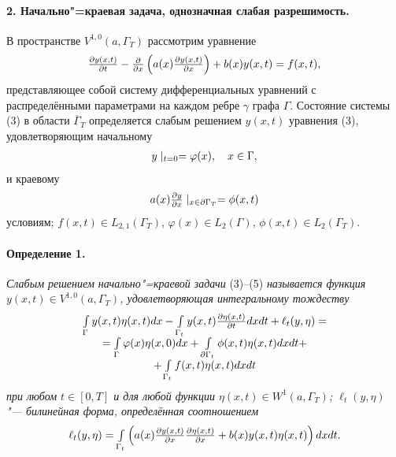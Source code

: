 \paragraph{2. Начально"=краевая задача, однозначная слабая разрешимость.}
В пространстве $V^{1,0}(a,\Gamma_{T})$ рассмотрим уравнение
\begin{equation}\label{eq5}
{{\begin{array}{*{20}c}
 \frac{\partial y(x,t)}{\partial t}-\frac{\partial }{\partial x }\left(a(x)\frac{\partial y(x,t)}{\partial x}\right)+b(x)y(x,t)=f(x,t),
 \end{array} }}
\end{equation}
представляющее собой систему дифференциальных уравнений с распределёнными параметрами на каждом ребре $\gamma$ графа $\Gamma$. Состояние системы (3) в области $\overline{\Gamma}_{T}$ определяется  слабым решением $y(x,t)$ уравнения (3), удовлетворяющим начальному
\begin{equation}\label{eq6}
{{\begin{array}{*{20}c}
y\mid_{t=0}=\varphi(x),\quad x\in\Gamma,
 \end{array} }}
\end{equation}
и краевому
\begin{equation}\label{eq8}
{{\begin{array}{*{20}c}
a(x)\frac{\partial y}{\partial x}\mid_{x\in\partial\Gamma_T}=\phi(x,t)
 \end{array} }}
\end{equation}
условиям; $f(x,t)\in L_{2,1}(\Gamma_{T})$, $\varphi(x)\in L_2(\Gamma)$, $\phi(x,t)\in L_{2}(\Gamma_{T})$.


\paragraph{Определение 1.}  \emph{Слабым решением начально"=краевой задачи} (3)--(5) \emph{называется функция $y(x,t)\in V^{1,0}(a,\Gamma_{T})$, удовлетворяющая интегральному тождеству}
\begin{equation}\label{eq8}
{{\begin{array}{*{20}c}
\int\limits_{\Gamma}y(x,t)\eta(x,t) dx-\int\limits_{\Gamma_{t}}y(x,t)\frac{\partial \eta(x,t)}{\partial t}dxdt+\ell_{t}(y,\eta)=
\\
=\int\limits_{\Gamma}\varphi(x)\eta(x,0)dx+
\int\limits_{\partial\Gamma_{t}}\phi(x,t)\eta(x,t) dxdt+\\
+\int\limits_{\Gamma_{t}}f(x,t)\eta(x,t) dxdt
 \end{array} }}
\end{equation}
\emph{при любом $t\in[0,T]$ и для любой функции $\eta(x,t)\in W^{1}(a,\Gamma_{T})$; $\ell_t(y,\eta)$ "--- билинейная форма, определённая соотношением}
$$
{{\begin{array}{*{20}c}
\ell_t(y,\eta)=\int\limits_{\Gamma_{t}}\left(a(x)\frac{\partial y(x,t)}{\partial x}\frac{\partial \eta(x,t)}{\partial x}+b(x)y(x,t)\eta(x,t)\right)dxdt.
 \end{array} }}
$$



